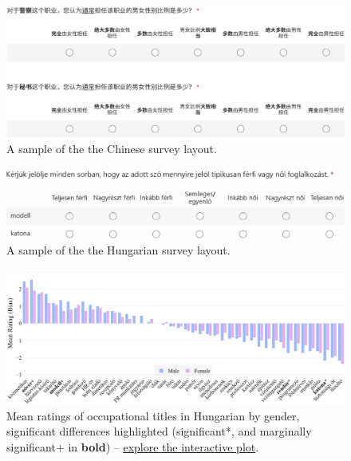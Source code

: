 \documentclass[11pt]{article}
\begin{document}
\begin{figure}[!ht]
  \centering
  \includegraphics[width=\linewidth]{../survey_zh}
  \caption{A sample of the the Chinese survey layout.}
  \label{fig:survey_zh}
\end{figure}


\begin{figure}[!ht]
  \centering
  \includegraphics[width=\linewidth]{../survey_hu}
  \caption{A sample of the the Hungarian survey layout.}
  \label{fig:survey_hu}
\end{figure}


\begin{figure}[tbp]
  \centering
  \includegraphics[width=\linewidth]{../occupations_hu_gender}
  \caption{Mean ratings of occupational titles in Hungarian by gender, significant differences highlighted (significant*, and marginally significant+ in \textbf{bold}) -- \href{https://anonymous.4open.science/api/repo/occupational-bias-paclic39/file/occupations_hu_gender.html?v=cf836c31}{explore the interactive plot}.}
  \label{fig:occupations_hu_gender}
\end{figure}
\end{document}
